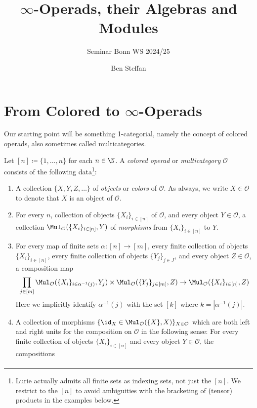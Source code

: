 \documentclass[topology]{bsteffan-notes}
\title{$\infty$-Operads, their Algebras and Modules}
\subtitle{Seminar Bonn WS 2024/25}
\author{Ben Steffan}
\date{\DTMdisplaydate{2024}{11}{05}{-1}}
\newcommand{\cO}{{\mathcal{O}}}
\begin{document}
\maketitle
\tableofcontents

\section[\texorpdfstring{$\infty$}{Infinity}-Operads]{From Colored to \texorpdfstring{$\infty$}{Infinity}-Operads}
Our starting point will be something 1-categorial, namely the concept of colored operads, also sometimes called multicategories.
\begin{definition}
	Let $[n] \coloneq \{1, \ldots, n\}$ for each $n \in \N$.
	A \emph{colored operad} or \emph{multicategory} $\cO$ consists of the following data\footnote{Lurie actually admits all finite sets as indexing sets, not just the $[n]$. We restrict to the $[n]$ to avoid ambiguities with the bracketing of (tensor) products in the examples below.}:
	\begin{enumerate}
		\item A collection $\{X, Y, Z, \ldots\}$ of \emph{objects} or \emph{colors} of $\cO$.
			As always, we write $X \in \cO$ to denote that $X$ is an object of $\cO$.
		\item For every $n$, collection of objects $\{X_i\}_{i \in [n]}$ of $\cO$, and every object $Y \in \cO$, a collection $\Mul_{\cO}(\{X_i\}_{i \in [n]}, Y)$ of \emph{morphisms} from $\{X_i\}_{i \in [n]}$ to $Y$.
		\item For every map of finite sets $\alpha\colon [n] \to [m]$, every finite collection of objects $\{X_i\}_{i \in [n]}$, every finite collection of objects $\{Y_j\}_{j \in J}$, and every object $Z \in \cO$, a composition map
			\begin{equation*}
				\prod_{j \in [m]} \Mul_{\cO}(\{X_i\}_{i \in \alpha^{-1}(j)}, Y_j) \times \Mul_{\cO}(\{Y_j\}_{j \in [m]}, Z) \to \Mul_{\cO}(\{X_i\}_{i \in [n]}, Z)
			\end{equation*}
			Here we implicitly identify $\alpha^{-1}(j)$ with the set $[k]$ where $k = |\alpha^{-1}(j)|$.
		\item A collection of morphisms $\{\id_X \in \Mul_{\cO}(\{X\}, X)\}_{X \in \cO}$ which are both left and right units for the composition on $\cO$ in the following sense: For every finite collection of objects $\{X_i\}_{i \in [n]}$ and every object $Y \in \cO$, the compositions
			\begin{align*}

\end{align*}
\end{enumerate}
\end{definition}
\end{document}
